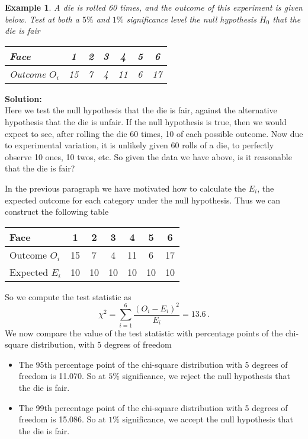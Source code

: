 \documentclass[12pt]{article}
\newtheorem{example}[theorem]{Example}
\begin{document}
\begin{example}
A die is rolled 60 times, and the outcome of this experiment is given below. Test at both a $5\%$ and $1\%$ significance level the null hypothesis $H_{0}$ that the die is fair
\begin{center}
\begin{tabular}{|l|c|c|c|c|c|c|}
  \hline
  Face & 1 & 2 & 3 & 4 & 5 & 6 \\ \hline
  Outcome $O_{i}$ & 15 & 7 & 4 & 11 & 6 & 17 \\
  \hline
\end{tabular}
\end{center}
\end{example}
\begin{mdframed}
{\bf Solution:}\\
Here we test the null hypothesis that the die is fair, against the alternative hypothesis that the die is unfair. If the null hypothesis is true, then we would expect to see, after rolling the die 60 times, 10 of each possible outcome. Now due to experimental variation, it is unlikely given $60$ rolls of a die, to perfectly observe 10 ones, 10 twos, etc. So given the data we have above, is it reasonable that the die is fair?

In the previous paragraph we have motivated how to calculate the $E_{i}$, the expected outcome for each category under the null hypothesis. Thus we can construct the following table
\begin{center}
\begin{tabular}{|l|c|c|c|c|c|c|}
  \hline
  Face & 1 & 2 & 3 & 4 & 5 & 6 \\ \hline
  Outcome $O_{i}$ & 15 & 7 & 4 & 11 & 6 & 17 \\
  Expected $E_{i}$ & 10 & 10 & 10 &10 &10 &10\\
  \hline
\end{tabular}
\end{center}

So we compute the test statistic as
$$
\chi^{2}=\sum_{i=1}^{6}\frac{(O_{i}-E_{i})^2}{E_{i}}=13.6 \, .
$$
We now compare the value of the test statistic with percentage points of the chi-square distribution, with $5$ degrees of freedom
\begin{itemize}
\item The 95th percentage point of the chi-square distribution with 5 degrees of freedom is 11.070. So at $5\%$ significance, we reject the null hypothesis that the die is fair.
\item The 99th percentage point of the chi-square distribution with 5 degrees of freedom is 15.086. So at $1\%$ significance, we accept the null hypothesis that the die is fair.
\end{itemize}
\end{mdframed}
\end{document}
